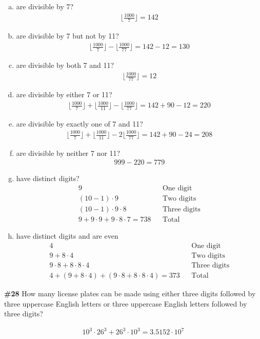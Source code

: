 \documentclass{article}
\newcommand{\problem}[1]{\textbf{\##1}}
\newcommand{\prob}[1]{\problem{#1}}
\begin{document}
\begin{enumerate}[a)]
    \item are divisible by 7?
    \begin{align*}
        \lfloor \frac{1000}{7} \rfloor = 142
    \end{align*}
    \item are divisible by 7 but not by 11?
    \begin{align*}
        \lfloor \frac{1000}{7} \rfloor - \lfloor \frac{1000}{77} \rfloor = 142 - 12 = 130
    \end{align*}
    \item are divisible by both 7 and 11?
    \begin{align*}
        \lfloor \frac{1000}{77} \rfloor = 12
    \end{align*}
    \item are divisible by either 7 or 11?
    \begin{align*}
        \lfloor \frac{1000}{7} \rfloor + \lfloor \frac{1000}{11} \rfloor - \lfloor \frac{1000}{77} \rfloor = 142 + 90 - 12 = 220
    \end{align*}
    \item are divisible by exactly one of 7 and 11?
    \begin{align*}
        \lfloor \frac{1000}{7} \rfloor + \lfloor \frac{1000}{11} \rfloor - 2 \lfloor \frac{1000}{77} \rfloor = 142 + 90 - 24 = 208
    \end{align*}
    \item are divisible by neither 7 nor 11?
    \begin{align}
        999 - 220 = 779
    \end{align}
    \item have distinct digits?
    \begin{align*}
        9 && \text{One digit}\\
        (10-1) \cdot 9 && \text{Two digits}\\
        (10-1) \cdot 9 \cdot 8 && \text{Three digits}\\
        9 + 9 \cdot 9 + 9 \cdot 8 \cdot 7 = 738 && \text{Total}
    \end{align*}
    \item have distinct digits and are even
    \begin{align*}
        4 && \text{One digit}\\
        9 + 8 \cdot 4 && \text{Two digits}\\
        9 \cdot 8 + 8 \cdot 8 \cdot 4 && \text{Three digits}\\
        4 + (9 + 8 \cdot 4) + (9 \cdot 8 + 8 \cdot 8 \cdot 4) = 373 && \text{Total}
    \end{align*}

\end{enumerate}
\pagebreak
\prob{28}
How many license plates can be made using either three digits followed by three uppercase English letters or three uppercase English letters followed by three digits?

\begin{align*}
    10^3 \cdot 26^3 + 26^3 \cdot 10^3 = 3.5152 \cdot 10^7
\end{align*}
\pagebreak
\end{document}
